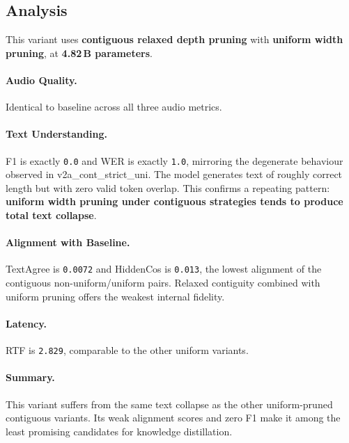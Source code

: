 \documentclass[11pt,a4paper]{article}
\newcommand{\scoreval}[1]{\texttt{#1}}
\begin{document}
\subsection{Analysis}

This variant uses \textbf{contiguous relaxed depth pruning} with \textbf{uniform width pruning}, at \textbf{4.82\,B parameters}.

\paragraph{Audio Quality.}
Identical to baseline across all three audio metrics.

\paragraph{Text Understanding.}
F1 is exactly \scoreval{0.0} and WER is exactly \scoreval{1.0}, mirroring the degenerate behaviour observed in v2a\_cont\_strict\_uni. The model generates text of roughly correct length but with zero valid token overlap. This confirms a repeating pattern: \textbf{uniform width pruning under contiguous strategies tends to produce total text collapse}.

\paragraph{Alignment with Baseline.}
TextAgree is \scoreval{0.0072} and HiddenCos is \scoreval{0.013}, the lowest alignment of the contiguous non-uniform/uniform pairs. Relaxed contiguity combined with uniform pruning offers the weakest internal fidelity.

\paragraph{Latency.}
RTF is \scoreval{2.829}, comparable to the other uniform variants.

\paragraph{Summary.}
This variant suffers from the same text collapse as the other uniform-pruned contiguous variants. Its weak alignment scores and zero F1 make it among the least promising candidates for knowledge distillation.

\newpage
\end{document}
